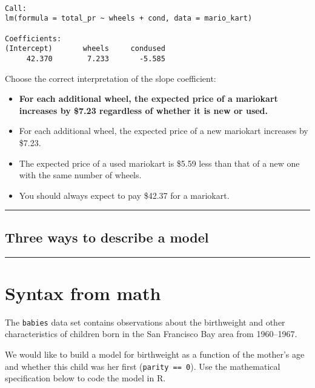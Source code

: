 \documentclass[
]{book}
\begin{document}
\begin{verbatim}

Call:
lm(formula = total_pr ~ wheels + cond, data = mario_kart)

Coefficients:
(Intercept)       wheels     condused  
     42.370        7.233       -5.585  
\end{verbatim}

Choose the correct interpretation of the slope coefficient:

\begin{itemize}
\item
  \textbf{For each additional wheel, the expected price of a mariokart increases by \$7.23 regardless of whether it is new or used.}
\item
  For each additional wheel, the expected price of a new mariokart increases by \$7.23.
\item
  The expected price of a used mariokart is \$5.59 less than that of a new one with the same number of wheels.
\item
  You should always expect to pay \$42.37 for a mariokart.
\end{itemize}

\begin{center}\rule{0.5\linewidth}{0.5pt}\end{center}

\hypertarget{three-ways-to-describe-a-model}{%
\subsection*{Three ways to describe a model}\label{three-ways-to-describe-a-model}}

\begin{center}\rule{0.5\linewidth}{0.5pt}\end{center}

\hypertarget{syntax-from-math}{%
\section{Syntax from math}\label{syntax-from-math}}

The \texttt{babies} data set contains observations about the birthweight and other characteristics of children born in the San Francisco Bay area from 1960--1967.

We would like to build a model for birthweight as a function of the mother's age and whether this child was her first (\texttt{parity\ ==\ 0}). Use the mathematical specification below to code the model in R.
\end{document}
